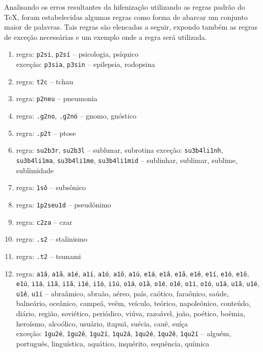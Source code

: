 \documentclass{article}
\begin{document}
Analisando os erros resultantes da hifenização utilizando as regras padrão do
TeX, foram estabelecidas algumas regras como forma de abarcar um conjunto maior
de palavras. Tais regras são elencadas a seguir, expondo também as regras de
exceção necessárias e um exemplo onde a regra será utilizada.

\begin{enumerate}
\item regra: \texttt{p2si}, \texttt{p2sí} -- psicologia, psíquico\\
exceção: \texttt{p3sia}, \texttt{p3sin} -- epilepsia, rodopsina

\item regra: \texttt{t2c} -- tchau%

\item regra: \texttt{p2neu} -- pneumonia
    
\item regra: \texttt{.g2no}, \texttt{.g2nó} -- gnomo, gnóstico

\item regra: \texttt{.p2t} -- ptose%

\item regra: \texttt{su2b3r}, \texttt{su2b3l} -- sublunar, subrotina
exceção: \texttt{su3b4li1nh}, \texttt{su3b4li1ma}, \texttt{su3b4li1me}, \texttt{su3b4li1mid} -- sublinhar, sublimar, sublime, sublimidade

\item regra: \texttt{1sô} -- subsônico

\item regra: \texttt{1p2seu1d} -- pseudônimo

\item regra: \texttt{c2za} -- czar

\item regra: \texttt{.s2} -- stalinismo

\item regra: \texttt{.t2} -- tsunami

\item regra: \texttt{a1â}, \texttt{a1ã}, \texttt{a1é}, \texttt{a1í}, \texttt{a1ó}, \texttt{a1ô}, \texttt{a1ú}, \texttt{e1á}, \texttt{e1â}, \texttt{e1ã}, \texttt{e1ê}, \texttt{e1í}, \texttt{e1ó}, \texttt{e1ô}, \texttt{e1ú}, \texttt{i1á}, \texttt{i1ã}, \texttt{i1ã}, \texttt{i1é}, \texttt{i1ó}, \texttt{i1ú}, \texttt{o1á}, \texttt{o1ã}, \texttt{o1é}, \texttt{o1ê}, \texttt{o1í}, \texttt{o1ó}, \texttt{u1á}, \texttt{u1ã}, \texttt{u1é}, \texttt{u1ê}, \texttt{u1í} --  abraâmico, abraão, aéreo, país, caótico, faraônico, saúde, balneário, oceânico, campeã, veêm, veículo, teórico, napoleônico, conteúdo, diário, região, soviético, periódico, viúva, razoável, joão, poético, boêmia, heroísmo, alcoólico, usuário, itapuã, suécia, cauê, suíça \\
exceção: \texttt{1gu2é}, \texttt{1gu2ê}, \texttt{1gu2í}, \texttt{1qu2á}, \texttt{1qu2é}, \texttt{1qu2ê}, \texttt{1qu2í} -- alguém, português, linguística, aquático, inquérito, sequência, química


\end{enumerate}
\end{document}
